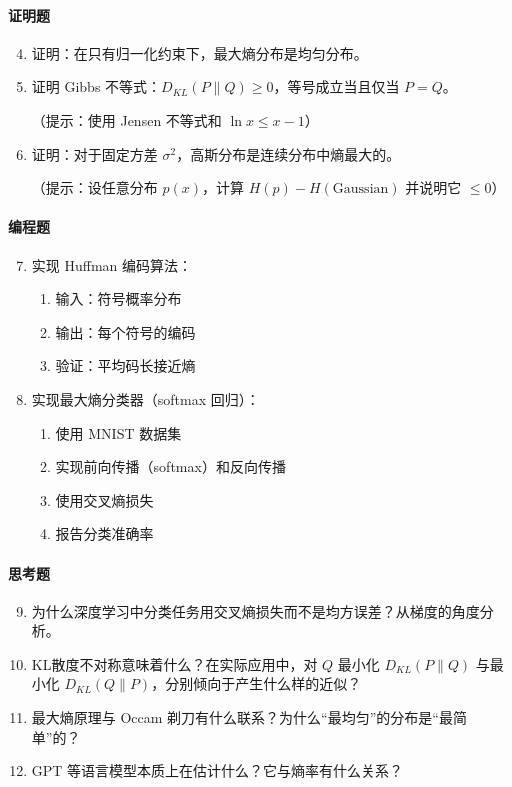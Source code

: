 \paragraph{证明题}
\begin{enumerate}
    \setcounter{enumi}{3}
    \item 证明：在只有归一化约束下，最大熵分布是均匀分布。
    
    \item 证明 Gibbs 不等式：$D_{KL}(P \| Q) \geq 0$，等号成立当且仅当 $P = Q$。
    
    （提示：使用 Jensen 不等式和 $\ln x \leq x - 1$）
    
    \item 证明：对于固定方差 $\sigma^2$，高斯分布是连续分布中熵最大的。
    
    （提示：设任意分布 $p(x)$，计算 $H(p) - H(\text{Gaussian})$ 并说明它 $\leq 0$）
\end{enumerate}

\paragraph{编程题}
\begin{enumerate}
    \setcounter{enumi}{6}
    \item 实现 Huffman 编码算法：
    \begin{enumerate}
        \item 输入：符号概率分布
        \item 输出：每个符号的编码
        \item 验证：平均码长接近熵
    \end{enumerate}
    
    \item 实现最大熵分类器（softmax 回归）：
    \begin{enumerate}
        \item 使用 MNIST 数据集
        \item 实现前向传播（softmax）和反向传播
        \item 使用交叉熵损失
        \item 报告分类准确率
    \end{enumerate}
\end{enumerate}

\paragraph{思考题}
\begin{enumerate}
    \setcounter{enumi}{8}
    \item 为什么深度学习中分类任务用交叉熵损失而不是均方误差？从梯度的角度分析。
    
    \item KL散度不对称意味着什么？在实际应用中，对 $Q$ 最小化 $D_{KL}(P \| Q)$ 与最小化 $D_{KL}(Q \| P)$，分别倾向于产生什么样的近似？
    
    \item 最大熵原理与 Occam 剃刀有什么联系？为什么“最均匀”的分布是“最简单”的？
    
    \item GPT 等语言模型本质上在估计什么？它与熵率有什么关系？
\end{enumerate}